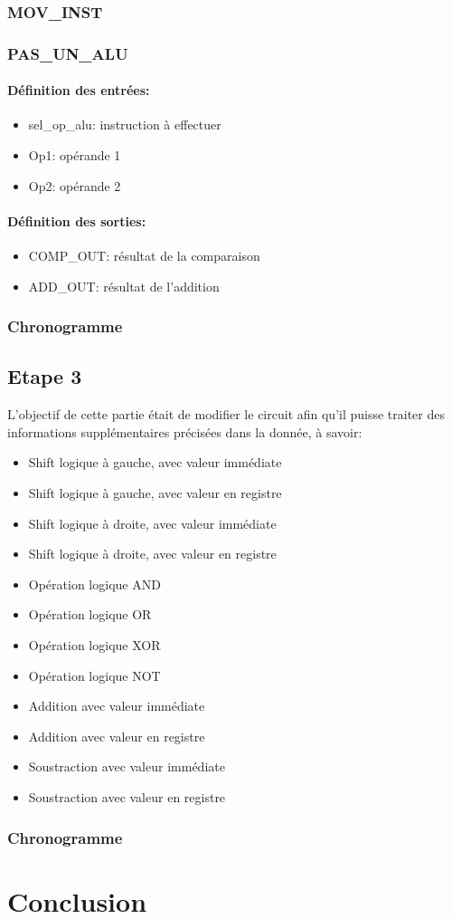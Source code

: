 \documentclass[a4paper]{article} %
\begin{document}
\subsubsection{MOV\_INST} \label{mov_inst}

\subsubsection{PAS\_UN\_ALU} \label{pas_alu}
\paragraph{Définition des entrées:}
\begin{itemize}
    \item     sel\_op\_alu: instruction à effectuer
    \item     Op1: opérande 1
    \item     Op2: opérande 2
\end{itemize}

\paragraph{Définition des sorties:}
\begin{itemize}
    \item     COMP\_OUT: résultat de la comparaison
    \item     ADD\_OUT: résultat de l'addition
\end{itemize}
\medskip

\subsubsection{Chronogramme}

\subsection{Etape 3}
L'objectif de cette partie était de modifier le circuit afin qu'il puisse traiter des informations supplémentaires précisées dans la donnée, à savoir:
\medskip

\begin{itemize}
    \item Shift logique à gauche, avec valeur immédiate
    \item Shift logique à gauche, avec valeur en registre
    \item Shift logique à droite, avec valeur immédiate
    \item Shift logique à droite, avec valeur en registre
    \item Opération logique AND
    \item Opération logique OR
    \item Opération logique XOR
    \item Opération logique NOT
    \item Addition avec valeur immédiate
    \item Addition avec valeur en registre
    \item Soustraction avec valeur immédiate
    \item Soustraction avec valeur en registre
\end{itemize}
\subsubsection{Chronogramme}
\section{Conclusion}
\end{document}
